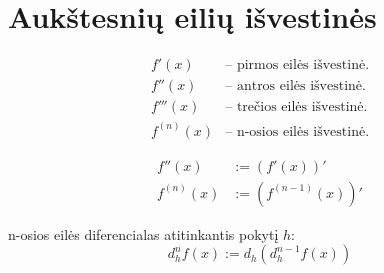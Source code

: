 \section{Aukštesnių eilių išvestinės}

\begin{notation}
  \begin{align*}
    f'(x) &– \text{ pirmos eilės išvestinė.} \\
    f''(x) &– \text{ antros eilės išvestinė.} \\
    f'''(x) &– \text{ trečios eilės išvestinė.} \\
    f^{(n)}(x) &– \text{ n-osios eilės išvestinė.}
  \end{align*}
\end{notation}

\begin{defn}
  \begin{align*}
    f''(x) &:= (f'(x))' \\
    f^{(n)}(x) &:= (f^{(n-1)}(x))'
  \end{align*}
\end{defn}

\begin{defn}
  n-osios eilės diferencialas atitinkantis pokytį $h$:
  \begin{equation*}
    d^{n}_{h} f(x) := d_{h} (d^{n-1}_{h} f(x))
  \end{equation*}
\end{defn}

